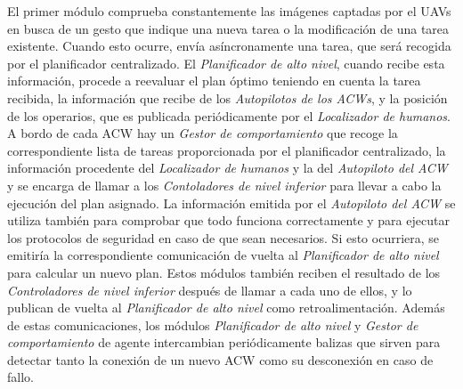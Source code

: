 \documentclass[fontsize=11pt, English=false, Español=true, Myfinal=true, twoside, numbers=noenddot]{scrbook}
\begin{document}
%      
%
%      
%
%      
%      

El primer módulo comprueba constantemente las imágenes captadas por el \glspl{UAV} en busca de un gesto que indique una nueva tarea o la modificación de una tarea existente. Cuando esto ocurre, envía asíncronamente una tarea, que será recogida por el planificador centralizado. El \emph{Planificador de alto nivel}, cuando recibe esta información, procede a reevaluar el plan óptimo teniendo en cuenta la tarea recibida, la información que recibe de los \emph{Autopilotos de los \glspl{ACW}}, y la posición de los operarios, que es publicada periódicamente por el \emph{Localizador de humanos}. A bordo de cada \gls{ACW} hay un \emph{Gestor de comportamiento} que recoge la correspondiente lista de tareas proporcionada por el planificador centralizado, la información procedente del \emph{Localizador de humanos} y la del \emph{Autopiloto del \gls{ACW}} y se encarga de llamar a los \emph{Contoladores de nivel inferior} para llevar a cabo la ejecución del plan asignado. La información emitida por el \emph{Autopiloto del \gls{ACW}} se utiliza también para comprobar que todo funciona correctamente y para ejecutar los protocolos de seguridad en caso de que sean necesarios. Si esto ocurriera, se emitiría la correspondiente comunicación de vuelta al \emph{Planificador de alto nivel} para calcular un nuevo plan. Estos módulos también reciben el resultado de los \emph{Controladores de nivel inferior} después de llamar a cada uno de ellos, y lo publican de vuelta al \emph{Planificador de alto nivel} como retroalimentación. Además de estas comunicaciones, los módulos \emph{Planificador de alto nivel} y \emph{Gestor de comportamiento} de agente intercambian periódicamente balizas que sirven para detectar tanto la conexión de un nuevo \gls{ACW} como su desconexión en caso de fallo. 
\end{document}
